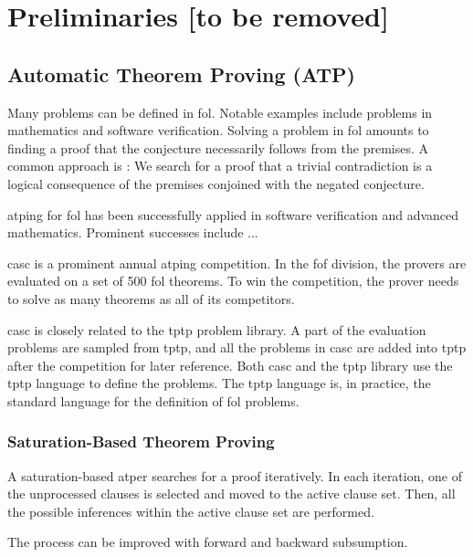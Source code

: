 \chapter{Preliminaries [to be removed]}

\section{Automatic Theorem Proving (ATP)}

Many problems can be defined in \gls{fol}.
Notable examples include problems in mathematics and software verification.
Solving a problem in \gls{fol} amounts to finding a proof that the conjecture necessarily follows from the premises.
A common approach is :
We search for a proof that a trivial contradiction is a logical consequence of the premises conjoined with the negated conjecture.

\Gls{atping} for \gls{fol} has been successfully applied in software verification and advanced mathematics.
Prominent successes include ...

\Gls{casc} is a prominent annual \gls{atping} competition.
In the \gls{fof} division, the provers are evaluated on a set of 500 \gls{fol} theorems.
To win the competition, the prover needs to solve as many theorems as all of its competitors.

\Gls{casc} is closely related to the \gls{tptp} problem library.
A part of the evaluation problems are sampled from \gls{tptp}, and all the problems in \gls{casc} are added into \gls{tptp} after the competition for later reference.
Both \gls{casc} and the \gls{tptp} library use the \gls{tptp} language to define the problems.
The \gls{tptp} language is, in practice, the standard language for the definition of \gls{fol} problems.

\subsection{Saturation-Based Theorem Proving}

A saturation-based \gls{atper} searches for a proof iteratively.
In each iteration, one of the unprocessed clauses is selected and moved to the active clause set.
Then, all the possible inferences within the active clause set are performed.

The process can be improved with forward and backward subsumption.

